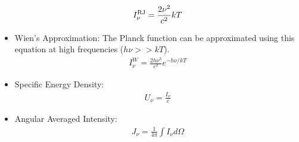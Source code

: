 \begin{itemize}
{    \begin{align}
    I_{\nu}^{\rm RJ} = \frac{2\nu^{2}}{c^{2}} kT
    \end{align}
    }
    \item{Wien's Approximation: The Planck function can be approximated using this equation at high frequencies ($h\nu>>kT$).
    \begin{align}
    I_{\nu}^{W} = \frac{2h\nu^{3}}{c^{2}}e^{-h\nu/kT}
    \end{align}
    }
    \item{Specific Energy Density:
    \begin{align}
    U_{\nu} = \frac{I_{\nu}}{c}
    \end{align}
    }
    \item{Angular Averaged Intensity:
    \begin{align}
    J_{\nu} = \frac{1}{4\pi} \int I_{\nu} d\Omega
    \end{align}
    }
\end{itemize}

